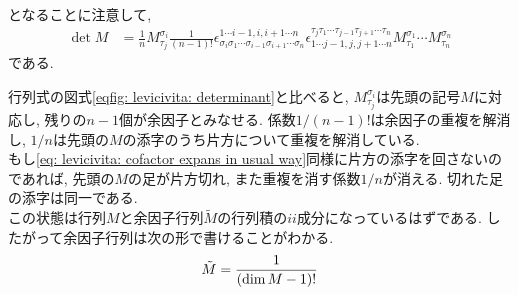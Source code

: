 \documentclass[dvipdfmx]{jsarticle}
\begin{document}
となることに注意して,
\begin{align*}
    \det M
    &=
    \frac{1}{n}
    M^{\sigma_i}_{\tau_j}
    \frac{1}{(n-1)!}
    \epsilon^{1\cdots i-1,i,i+1\cdots n}_{\sigma_i\sigma_1\cdots\sigma_{i-1}\sigma_{i+1}\cdots\sigma_n}
    \epsilon_{1\cdots j-1,j,j+1\cdots n}^{\tau_j\tau_1\cdots\tau_{j-1}\tau_{j+1}\cdots\tau_n}
    M^{\sigma_1}_{\tau_1}\cdots M_{\tau_n}^{\sigma_n}
\end{align*}
である.

行列式の図式\eqref{eqfig: levicivita: determinant}と比べると, $M^{\sigma_i}_{\tau_j}$は先頭の記号$M$に対応し, 残りの$n-1$個が余因子とみなせる.
係数$1/(n-1)!$は余因子の重複を解消し, $1/n$は先頭の$M$の添字のうち片方について重複を解消している.
\begin{equation*}
    
\end{equation*}
もし\eqref{eq: levicivita: cofactor expans in usual way}同様に片方の添字を回さないのであれば, 先頭の$M$の足が片方切れ, また重複を消す係数$1/n$が消える.
切れた足の添字は同一である.
\begin{equation*}
    
\end{equation*}
この状態は行列$M$と余因子行列$\tilde{M}$の行列積の$ii$成分になっているはずである.
したがって余因子行列は次の形で書けることがわかる.
\begin{equation}
    \label{eqfig: levicivita: adjugate mat}
    \tilde{M}
    =
    \frac{1}{(\dim M-1)!}
    \vcenter{\hbox{}}
\end{equation}
\end{document}
